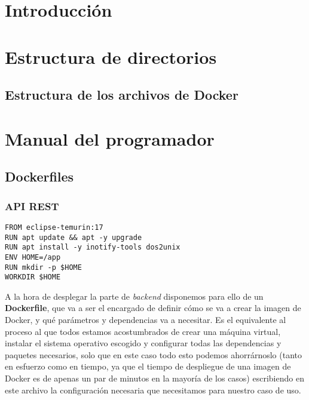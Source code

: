 
\section{Introducción}

\section{Estructura de directorios}

\subsection{Estructura de los archivos de Docker}


\section{Manual del programador}

\subsection{Dockerfiles}

\subsubsection{API REST}

\begin{lstlisting}
FROM eclipse-temurin:17
RUN apt update && apt -y upgrade
RUN apt install -y inotify-tools dos2unix
ENV HOME=/app
RUN mkdir -p $HOME
WORKDIR $HOME
\end{lstlisting}

A la hora de desplegar la parte de \textit{backend} disponemos para ello de un \textbf{Dockerfile}, que va a ser el encargado de definir cómo se va a crear la imagen de Docker, y qué parámetros y dependencias va a necesitar. Es el equivalente al proceso al que todos estamos acostumbrados de crear una máquina virtual, instalar el sistema operativo escogido y configurar todas las dependencias y paquetes necesarios, solo que en este caso todo esto podemos ahorrárnoslo (tanto en esfuerzo como en tiempo, ya que el tiempo de despliegue de una imagen de Docker es de apenas un par de minutos en la mayoría de los casos) escribiendo en este archivo la configuración necesaria que necesitamos para nuestro caso de uso.

